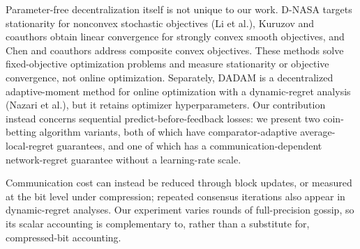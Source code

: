 \documentclass[12pt,english]{reviewresponse}
\begin{document}
\begin{revresponse}
\begin{changes}
        Parameter-free decentralization itself is not unique to our work.
        D-NASA targets stationarity for nonconvex stochastic objectives (Li et al.), Kuruzov and coauthors obtain linear convergence for strongly convex smooth objectives, and Chen and coauthors address composite convex objectives.
        These methods solve fixed-objective optimization problems and measure stationarity or objective convergence, not online optimization.
        Separately, DADAM is a decentralized adaptive-moment method for online optimization with a dynamic-regret analysis (Nazari et al.), but it retains optimizer hyperparameters.
        Our contribution instead concerns sequential predict-before-feedback losses: we present two coin-betting algorithm variants, both of which have comparator-adaptive average-local-regret guarantees, and one of which has a communication-dependent network-regret guarantee without a learning-rate scale.

        Communication cost can instead be reduced through block updates, or measured at the bit level under compression; repeated consensus iterations also appear in dynamic-regret analyses.
        Our experiment varies rounds of full-precision gossip, so its scalar accounting is complementary to, rather than a substitute for, compressed-bit accounting.
    \end{changes}
\end{revresponse}
\end{document}
